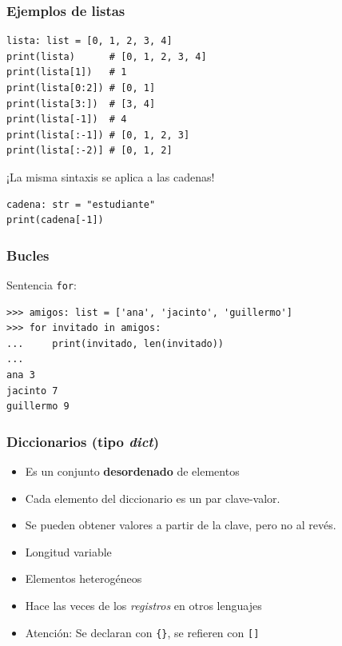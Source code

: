 \begin{frame}[fragile]
\frametitle{Ejemplos de listas}

  \begin{footnotesize}
\begin{verbatim}
lista: list = [0, 1, 2, 3, 4]
print(lista)      # [0, 1, 2, 3, 4]
print(lista[1])   # 1 
print(lista[0:2]) # [0, 1]
print(lista[3:])  # [3, 4]
print(lista[-1])  # 4
print(lista[:-1]) # [0, 1, 2, 3]
print(lista[:-2)] # [0, 1, 2]
\end{verbatim}
  \end{footnotesize}
  \begin{center}
¡La misma sintaxis se aplica a las cadenas!
  \end{center}

  \begin{footnotesize}
\begin{verbatim}
cadena: str = "estudiante"
print(cadena[-1])
\end{verbatim}
  \end{footnotesize}


\end{frame}


\begin{frame}[fragile]

\frametitle{ Bucles}
Sentencia \verb|for|:

\begin{footnotesize}
\begin{verbatim}
>>> amigos: list = ['ana', 'jacinto', 'guillermo']
>>> for invitado in amigos:
...     print(invitado, len(invitado))
... 
ana 3
jacinto 7
guillermo 9 
\end{verbatim}
\end{footnotesize}



\end{frame}





\begin{frame}[fragile]
\frametitle{Diccionarios (tipo \emph{dict})}  

\begin{itemize}
\item Es un conjunto {\bf desordenado} de elementos 
\item Cada elemento del diccionario es un par clave-valor. 
\item Se pueden obtener valores a partir de la clave, pero no al revés.
\item Longitud variable
\item Elementos heterogéneos
\item Hace las veces de los \emph{registros} en otros lenguajes
\item Atención: Se declaran con \verb|{}|, se refieren con \verb|[]|
\end{itemize}
\end{frame}


